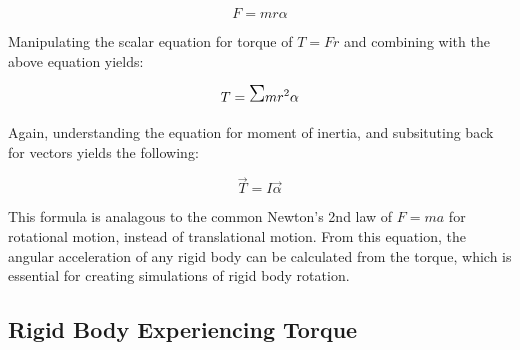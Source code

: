 \begin{equation}
F = mr\alpha
\end{equation}

Manipulating the scalar equation for torque of $T = Fr$ and combining with the above equation yields:

\begin{equation}
T = \mathlarger{\mathlarger{\mathlarger{\Sigma}}} m r^2 \alpha
\end{equation}

Again, understanding the equation for moment of inertia, and subsituting back for vectors yields the following:

\begin{equation}
\vec{T} = I \vec{\alpha}
\end{equation}

This formula is analagous to the common Newton's 2nd law of  $F = ma$ for rotational motion, instead of translational motion.  From this equation, the angular acceleration of any rigid body can be calculated from the torque, which is essential for creating simulations of rigid body rotation.  

\subsection{Rigid Body Experiencing Torque}
















